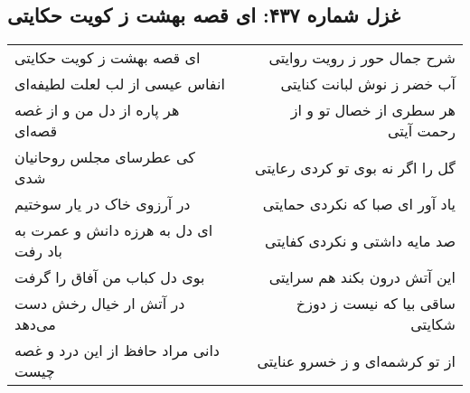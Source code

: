 \begin{center}
\section*{غزل شماره ۴۳۷: ای قصه بهشت ز کویت حکایتی}
\label{sec:sh437}
\begin{longtable}{l p{0.5cm} r}
ای قصه بهشت ز کویت حکایتی
&&
شرح جمال حور ز رویت روایتی
\\
انفاس عیسی از لب لعلت لطیفه‌ای
&&
آب خضر ز نوش لبانت کنایتی
\\
هر پاره از دل من و از غصه قصه‌ای
&&
هر سطری از خصال تو و از رحمت آیتی
\\
کی عطرسای مجلس روحانیان شدی
&&
گل را اگر نه بوی تو کردی رعایتی
\\
در آرزوی خاک در یار سوختیم
&&
یاد آور ای صبا که نکردی حمایتی
\\
ای دل به هرزه دانش و عمرت به باد رفت
&&
صد مایه داشتی و نکردی کفایتی
\\
بوی دل کباب من آفاق را گرفت
&&
این آتش درون بکند هم سرایتی
\\
در آتش ار خیال رخش دست می‌دهد
&&
ساقی بیا که نیست ز دوزخ شکایتی
\\
دانی مراد حافظ از این درد و غصه چیست
&&
از تو کرشمه‌ای و ز خسرو عنایتی
\\
\end{longtable}
\end{center}

